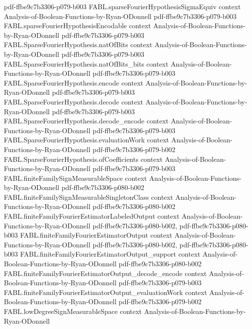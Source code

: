 \begin{theorem}
  {pdf-ffbe9c7b3306-p079-b003}
\proofstep
  {FABL.sparseFourierHypothesisSigmaEquiv}
  {context}
  {Analysis-of-Boolean-Functions-by-Ryan-ODonnell}
  {pdf-ffbe9c7b3306-p079-b003}
\proofstep
  {FABL.sparseFourierHypothesisEncodable}
  {context}
  {Analysis-of-Boolean-Functions-by-Ryan-ODonnell}
  {pdf-ffbe9c7b3306-p079-b003}
\proofstep
  {FABL.SparseFourierHypothesis.natOfBits}
  {context}
  {Analysis-of-Boolean-Functions-by-Ryan-ODonnell}
  {pdf-ffbe9c7b3306-p079-b003}
\proofstep
  {FABL.SparseFourierHypothesis.natOfBits_bits}
  {context}
  {Analysis-of-Boolean-Functions-by-Ryan-ODonnell}
  {pdf-ffbe9c7b3306-p079-b003}
\proofstep
  {FABL.SparseFourierHypothesis.encode}
  {context}
  {Analysis-of-Boolean-Functions-by-Ryan-ODonnell}
  {pdf-ffbe9c7b3306-p079-b003}
\proofstep
  {FABL.SparseFourierHypothesis.decode}
  {context}
  {Analysis-of-Boolean-Functions-by-Ryan-ODonnell}
  {pdf-ffbe9c7b3306-p079-b003}
\proofstep
  {FABL.SparseFourierHypothesis.decode_encode}
  {context}
  {Analysis-of-Boolean-Functions-by-Ryan-ODonnell}
  {pdf-ffbe9c7b3306-p079-b003}
\proofstep
  {FABL.SparseFourierHypothesis.evaluationWork}
  {context}
  {Analysis-of-Boolean-Functions-by-Ryan-ODonnell}
  {pdf-ffbe9c7b3306-p079-b002}
\proofstep
  {FABL.SparseFourierHypothesis.ofCoefficients}
  {context}
  {Analysis-of-Boolean-Functions-by-Ryan-ODonnell}
  {pdf-ffbe9c7b3306-p079-b003}
\proofstep
  {FABL.finiteFamilySignMeasurableSpace}
  {context}
  {Analysis-of-Boolean-Functions-by-Ryan-ODonnell}
  {pdf-ffbe9c7b3306-p080-b002}
\proofstep
  {FABL.finiteFamilySignMeasurableSingletonClass}
  {context}
  {Analysis-of-Boolean-Functions-by-Ryan-ODonnell}
  {pdf-ffbe9c7b3306-p080-b002}
\proofstep
  {FABL.finiteFamilyFourierEstimatorLabeledOutput}
  {context}
  {Analysis-of-Boolean-Functions-by-Ryan-ODonnell}
  {pdf-ffbe9c7b3306-p080-b002,
    pdf-ffbe9c7b3306-p080-b003}
\proofstep
  {FABL.finiteFamilyFourierEstimatorOutput}
  {context}
  {Analysis-of-Boolean-Functions-by-Ryan-ODonnell}
  {pdf-ffbe9c7b3306-p080-b002,
    pdf-ffbe9c7b3306-p080-b003}
\proofstep
  {FABL.finiteFamilyFourierEstimatorOutput_support}
  {context}
  {Analysis-of-Boolean-Functions-by-Ryan-ODonnell}
  {pdf-ffbe9c7b3306-p080-b002}
\proofstep
  {FABL.finiteFamilyFourierEstimatorOutput_decode_encode}
  {context}
  {Analysis-of-Boolean-Functions-by-Ryan-ODonnell}
  {pdf-ffbe9c7b3306-p079-b003}
\proofstep
  {FABL.finiteFamilyFourierEstimatorOutput_evaluationWork}
  {context}
  {Analysis-of-Boolean-Functions-by-Ryan-ODonnell}
  {pdf-ffbe9c7b3306-p079-b002}
\proofstep
  {FABL.lowDegreeSignMeasurableSpace}
  {context}
  {Analysis-of-Boolean-Functions-by-Ryan-ODonnell}

\end{theorem}
